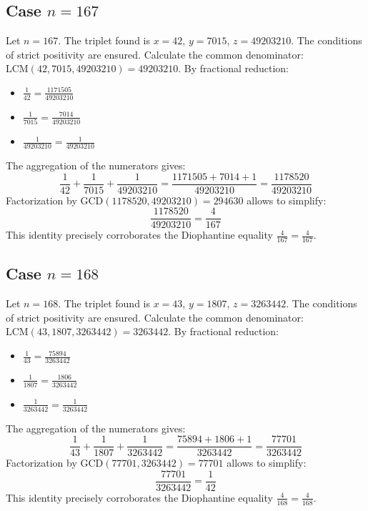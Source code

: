 \documentclass[11pt,a4paper]{article}
\begin{document}
\subsection{Case $n = 167$}
Let $n = 167$. The triplet found is $x = 42$, $y = 7015$, $z = 49203210$.
The conditions of strict positivity are ensured.
Calculate the common denominator: $\text{LCM}(42, 7015, 49203210) = 49203210$.
By fractional reduction:
\begin{itemize}
    \item $\frac{1}{42} = \frac{1171505}{49203210}$
    \item $\frac{1}{7015} = \frac{7014}{49203210}$
    \item $\frac{1}{49203210} = \frac{1}{49203210}$
\end{itemize}
The aggregation of the numerators gives:
$$ \frac{1}{42} + \frac{1}{7015} + \frac{1}{49203210} = \frac{1171505 + 7014 + 1}{49203210} = \frac{1178520}{49203210} $$
Factorization by $\text{GCD}(1178520, 49203210) = 294630$ allows to simplify:
$$ \frac{1178520}{49203210} = \frac{4}{167} $$
This identity precisely corroborates the Diophantine equality $\frac{4}{167} = \frac{4}{167}$.

\subsection{Case $n = 168$}
Let $n = 168$. The triplet found is $x = 43$, $y = 1807$, $z = 3263442$.
The conditions of strict positivity are ensured.
Calculate the common denominator: $\text{LCM}(43, 1807, 3263442) = 3263442$.
By fractional reduction:
\begin{itemize}
    \item $\frac{1}{43} = \frac{75894}{3263442}$
    \item $\frac{1}{1807} = \frac{1806}{3263442}$
    \item $\frac{1}{3263442} = \frac{1}{3263442}$
\end{itemize}
The aggregation of the numerators gives:
$$ \frac{1}{43} + \frac{1}{1807} + \frac{1}{3263442} = \frac{75894 + 1806 + 1}{3263442} = \frac{77701}{3263442} $$
Factorization by $\text{GCD}(77701, 3263442) = 77701$ allows to simplify:
$$ \frac{77701}{3263442} = \frac{1}{42} $$
This identity precisely corroborates the Diophantine equality $\frac{4}{168} = \frac{4}{168}$.
\end{document}
